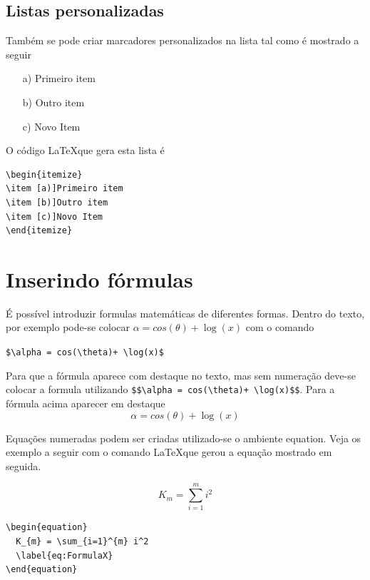 \subsection{Listas personalizadas}

Também se pode criar marcadores personalizados na lista tal como é mostrado a
seguir

\begin{itemize}
\item [a)]Primeiro item 
\item [b)]Outro item 
\item [c)]Novo Item
\end{itemize}


O código \LaTeX que gera esta lista é 

\begin{verbatim}
\begin{itemize}
\item [a)]Primeiro item 
\item [b)]Outro item 
\item [c)]Novo Item
\end{itemize}
\end{verbatim}

\section{Inserindo fórmulas}

É possível introduzir formulas matemáticas de diferentes formas. Dentro do
texto, por exemplo pode-se colocar $\alpha = cos(\theta) + \log(x)$ com o comando

\verb|$\alpha = cos(\theta)+ \log(x)$|

Para que a fórmula aparece com destaque no texto, mas sem numeração deve-se
colocar a formula utilizando \verb|$$\alpha = cos(\theta)+ \log(x)$$|. Para a fórmula
acima aparecer em destaque  $$\alpha = cos(\theta) + \log(x)$$

Equações numeradas podem ser criadas utilizado-se o ambiente equation. Veja os
exemplo a seguir com o comando \LaTeX que gerou a equação mostrado em seguida.


\begin{equation}
  K_{m} = \sum_{i=1}^{m} i^2
  \label{eq:FormulaX}
\end{equation}
%
\begin{verbatim}
\begin{equation}
  K_{m} = \sum_{i=1}^{m} i^2
  \label{eq:FormulaX}
\end{equation}
\end{verbatim}


